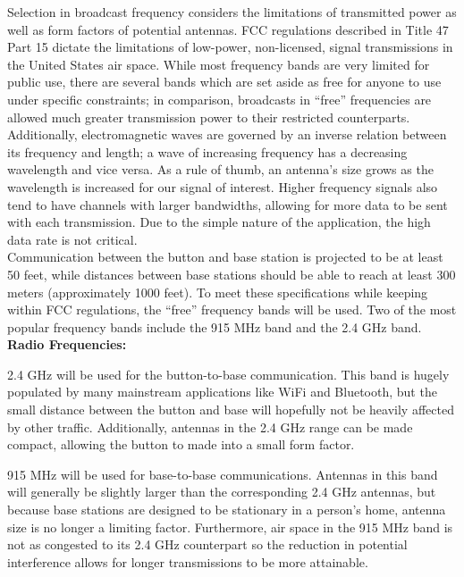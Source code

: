 \documentclass[journal,compsoc]{IEEEtran}
\begin{document}
\noindent Selection in broadcast frequency considers the limitations of transmitted power as well as form factors of potential antennas.  FCC regulations described in Title 47 Part 15 dictate the limitations of low-power, non-licensed, signal transmissions in the United States air space.  While most frequency bands are very limited for public use, there are several bands which are set aside as free for anyone to use under specific constraints; in comparison, broadcasts in “free” frequencies are allowed much greater transmission power to their restricted counterparts.  Additionally, electromagnetic waves are governed by an inverse relation between its frequency and length; a wave of increasing frequency has a decreasing wavelength and vice versa.  As a rule of thumb, an antenna’s size grows as the wavelength is increased for our signal of interest. Higher frequency signals also tend to have channels with larger bandwidths, allowing for more data to be sent with each transmission.  Due to the simple nature of the application, the high data rate is not critical.\\

\noindent Communication between the button and base station is projected to be at least 50 feet, while distances between base stations should be able to reach at least 300 meters (approximately 1000 feet).  To meet these specifications while keeping within FCC regulations, the “free” frequency bands will be used. Two of the most popular frequency bands include the 915 MHz band and the 2.4 GHz band.\\

\noindent \textbf {Radio Frequencies:}

\begin{LaTeXdescription}
  \item [2.4 GHz] will be used for the button-to-base communication. This band is hugely populated by many mainstream applications like WiFi and Bluetooth, but the small distance between the button and base will hopefully not be heavily affected by other traffic. Additionally, antennas in the 2.4 GHz range can be made compact, allowing the button to made into a small form factor.\\
  \item[915 MHz] will be used for base-to-base communications.  Antennas in this band will generally be slightly larger than the corresponding 2.4 GHz antennas, but because base stations are designed to be stationary in a person’s home, antenna size is no longer a limiting factor.  Furthermore, air space in the 915 MHz band is not as congested to its 2.4 GHz counterpart so the reduction in potential interference allows for longer transmissions to be more attainable.\\
\end{LaTeXdescription}
\end{document}
